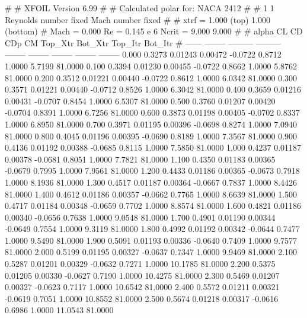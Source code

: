 #  
#       XFOIL         Version 6.99
#  
# Calculated polar for: NACA 2412                                       
#  
# 1 1 Reynolds number fixed          Mach number fixed         
#  
# xtrf =   1.000 (top)        1.000 (bottom)  
# Mach =   0.000     Re =     0.145 e 6     Ncrit =   9.000  9.000
#  
#   alpha    CL        CD       CDp       CM     Top_Xtr  Bot_Xtr  Top_Itr  Bot_Itr
#  ------ -------- --------- --------- -------- -------- -------- -------- --------
   0.000   0.3273   0.01243   0.00472  -0.0722   0.8712   1.0000   5.7199  81.0000
   0.100   0.3394   0.01230   0.00455  -0.0722   0.8662   1.0000   5.8762  81.0000
   0.200   0.3512   0.01221   0.00440  -0.0722   0.8612   1.0000   6.0342  81.0000
   0.300   0.3571   0.01221   0.00440  -0.0712   0.8526   1.0000   6.3042  81.0000
   0.400   0.3659   0.01216   0.00431  -0.0707   0.8454   1.0000   6.5307  81.0000
   0.500   0.3760   0.01207   0.00420  -0.0704   0.8391   1.0000   6.7256  81.0000
   0.600   0.3873   0.01198   0.00405  -0.0702   0.8337   1.0000   6.8950  81.0000
   0.700   0.3971   0.01195   0.00396  -0.0698   0.8274   1.0000   7.0940  81.0000
   0.800   0.4045   0.01196   0.00395  -0.0690   0.8189   1.0000   7.3567  81.0000
   0.900   0.4136   0.01192   0.00388  -0.0685   0.8115   1.0000   7.5850  81.0000
   1.000   0.4237   0.01187   0.00378  -0.0681   0.8051   1.0000   7.7821  81.0000
   1.100   0.4350   0.01183   0.00365  -0.0679   0.7995   1.0000   7.9561  81.0000
   1.200   0.4433   0.01186   0.00365  -0.0673   0.7918   1.0000   8.1936  81.0000
   1.300   0.4517   0.01187   0.00364  -0.0667   0.7837   1.0000   8.4426  81.0000
   1.400   0.4612   0.01186   0.00357  -0.0662   0.7765   1.0000   8.6639  81.0000
   1.500   0.4717   0.01184   0.00348  -0.0659   0.7702   1.0000   8.8574  81.0000
   1.600   0.4821   0.01186   0.00340  -0.0656   0.7638   1.0000   9.0548  81.0000
   1.700   0.4901   0.01190   0.00344  -0.0649   0.7554   1.0000   9.3119  81.0000
   1.800   0.4992   0.01192   0.00342  -0.0644   0.7477   1.0000   9.5490  81.0000
   1.900   0.5091   0.01193   0.00336  -0.0640   0.7409   1.0000   9.7577  81.0000
   2.000   0.5199   0.01195   0.00327  -0.0637   0.7347   1.0000   9.9469  81.0000
   2.100   0.5287   0.01201   0.00329  -0.0632   0.7271   1.0000  10.1785  81.0000
   2.200   0.5375   0.01205   0.00330  -0.0627   0.7190   1.0000  10.4275  81.0000
   2.300   0.5469   0.01207   0.00327  -0.0623   0.7117   1.0000  10.6542  81.0000
   2.400   0.5572   0.01211   0.00321  -0.0619   0.7051   1.0000  10.8552  81.0000
   2.500   0.5674   0.01218   0.00317  -0.0616   0.6986   1.0000  11.0543  81.0000
